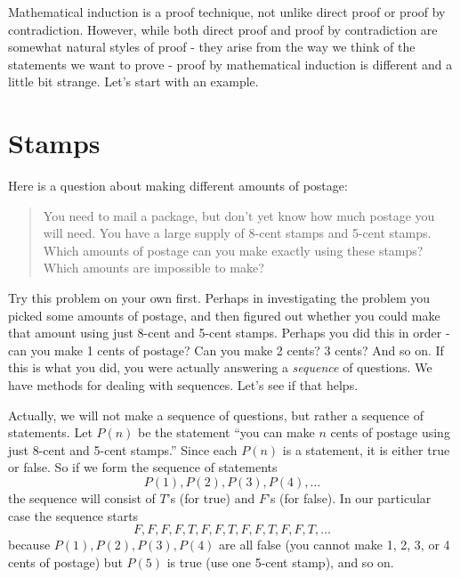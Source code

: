 \documentclass[12pt]{article}
\begin{document}
Mathematical induction is a proof technique, not unlike direct proof or proof by contradiction.  However, while both direct proof and proof by contradiction are somewhat natural styles of proof - they arise from the way we think of the statements we want to prove - proof by mathematical induction is different and a little bit strange.  Let's start with an example.

\section{Stamps}

Here is a question about making different amounts of postage:

\begin{quote}
  You need to mail a package, but don't yet know how much postage you will need. You have
a large supply of 8-cent stamps and 5-cent stamps. Which amounts of postage can you make
exactly using these stamps? Which amounts are impossible to make?
\end{quote}

Try this problem on your own first.  Perhaps in investigating the problem you picked some amounts of postage, and then figured out whether you could make that amount using just 8-cent and 5-cent stamps.  Perhaps you did this in order - can you make 1 cents of postage?  Can you make 2 cents?  3 cents? And so on.  If this is what you did, you were actually answering a {\em sequence} of questions.  We have methods for dealing with sequences.  Let's see if that helps.

Actually, we will not make a sequence of questions, but rather a sequence of statements.  Let $P(n)$ be the statement ``you can make $n$ cents of postage using just 8-cent and 5-cent stamps.''  Since each $P(n)$ is a statement, it is either true or false.  So if we form the sequence of statements
\[P(1), P(2), P(3), P(4), \ldots\]
the sequence will consist of $T$'s (for true) and $F$'s (for false).  In our particular case the sequence starts
\[F,F,F,F,T,F,F,T,F,F,T,F,F,T,\ldots\]
because $P(1), P(2), P(3), P(4)$ are all false (you cannot make 1, 2, 3, or 4 cents of postage) but $P(5)$ is true (use one 5-cent stamp), and so on.  
\end{document}
